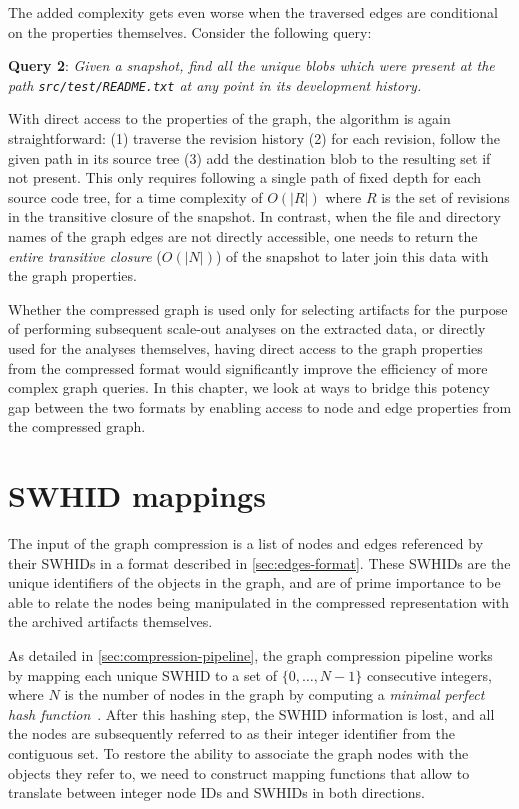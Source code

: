 The added complexity gets even worse when the traversed edges are conditional
on the properties themselves. Consider the following query:

\textbf{Query 2}: \emph{Given a snapshot, find all the unique blobs which
were present at the path \texttt{src/test/README.txt} at any point in its
development history.}

With direct access to the properties of the graph, the algorithm is again
straightforward: (1) traverse the revision history (2) for each revision,
follow the given path in its source tree (3) add the destination blob to the
resulting set if not present. This only requires following a single path of
fixed depth for each source code tree, for a time complexity of $O(|R|)$ where
$R$ is the set of revisions in the transitive closure of the snapshot. In
contrast, when the file and directory names of the graph edges are not directly
accessible, one needs to return the \emph{entire transitive closure} ($O(|N|)$)
of the snapshot to later join this data with the graph properties.

Whether the compressed graph is used only for selecting artifacts for the
purpose of performing subsequent scale-out analyses on the extracted data, or
directly used for the analyses themselves, having direct access to the graph
properties from the compressed format would significantly improve the
efficiency of more complex graph queries.
In this chapter, we look at ways to bridge this potency gap between the two
formats by enabling access to node and edge properties from the compressed
graph.

\section{SWHID mappings}

The input of the graph compression is a list of nodes and edges referenced by
their \glspl{SWHID} in a format described in \cref{sec:edges-format}. These
\glspl{SWHID} are the unique identifiers of the objects in the graph, and are
of prime importance to be able to relate the nodes being manipulated in the
compressed representation with the archived artifacts themselves.

As detailed in \cref{sec:compression-pipeline}, the graph compression pipeline
works by mapping each unique \gls{SWHID} to a set of $\{0,\ldots,N-1\}$
consecutive integers, where $N$ is the number of nodes in the graph by
computing a \emph{minimal perfect hash function}~\cite{GOVFSCF}.
After this hashing step, the \gls{SWHID} information is lost, and all the nodes
are subsequently referred to as their integer identifier from the contiguous
set. To restore the ability to associate the graph nodes with the objects they
refer to, we need to construct mapping functions that allow to translate
between integer node IDs and \glspl{SWHID} in both directions.

